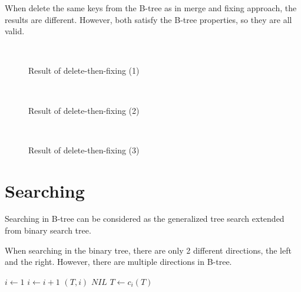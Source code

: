 \documentclass{article}
\begin{document}
When delete the same keys from the B-tree as in merge and fixing
approach, the results are different. However, both satisfy
the B-tree properties, so they are all valid.

\begin{figure}[htbp]
  \centering
  \\
  \caption{Result of delete-then-fixing (1)} \label{fig:result-del-fp1}
\end{figure}

\begin{figure}[htbp]
  \centering
   \\
  \caption{Result of delete-then-fixing (2)} \label{fig:result-del-fp2}
\end{figure}

\begin{figure}[htbp]
  \centering
   \\
  \caption{Result of delete-then-fixing (3)} \label{fig:result-del-fp3}
\end{figure}


\section{Searching}

Searching in B-tree can be considered as the generalized
tree search extended from binary search tree.

When searching in the binary tree, there are only 2 different directions,
the left and the right. However, there are multiple directions in B-tree.

\begin{algorithmic}[1]
  \Loop
    \State $i \gets 1$
      \State $i \gets i+1$
    \EndWhile
      \State \Return $(T, i)$
    \EndIf
      \State \Return $NIL$ 
    \Else
      \State $T \gets c_i(T)$
    \EndIf
  \EndLoop
\EndFunction
\end{algorithmic}
\end{document}

